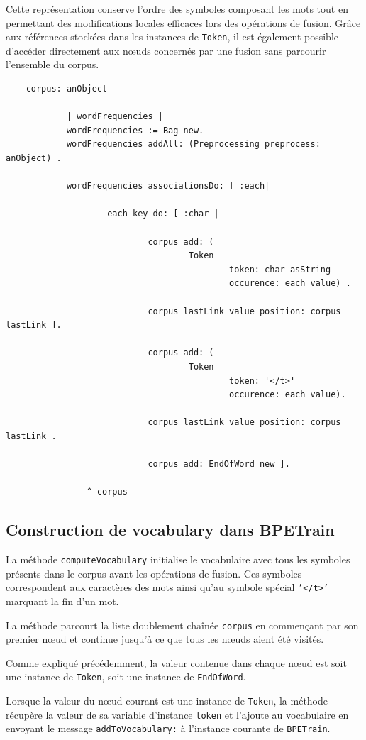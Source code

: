 \documentclass[12pt,a4paper]{report}
\begin{document}
	Cette représentation conserve l'ordre des symboles composant les mots tout en permettant des modifications locales efficaces lors des opérations de fusion. Grâce aux références stockées dans les instances de \texttt{Token}, il est également possible d'accéder directement aux nœuds concernés par une fusion sans parcourir l'ensemble du corpus.
	
	\begin{verbatim}
	corpus: anObject
			
			| wordFrequencies |		
			wordFrequencies := Bag new.	
			wordFrequencies addAll: (Preprocessing preprocess: anObject) .
					
			wordFrequencies associationsDo: [ :each|
							
					each key do: [ :char |
									
							corpus add: (
									Token 
											token: char asString
											occurence: each value) .
											
							corpus lastLink value position: corpus lastLink ].	
								
							corpus add: (
									Token
											token: '</t>'
											occurence: each value).
													
							corpus lastLink value position: corpus lastLink .
									
							corpus add: EndOfWord new ].
								
				^ corpus 
	\end{verbatim}
	
	\subsection{Construction de vocabulary dans BPETrain}
	
	La méthode \texttt{computeVocabulary} initialise le vocabulaire avec tous les symboles présents dans le corpus avant les opérations de fusion. Ces symboles correspondent aux caractères des mots ainsi qu’au symbole spécial \texttt{'</t>'} marquant la fin d’un mot.
	
	La méthode parcourt la liste doublement chaînée \texttt{corpus} en commençant par son premier nœud et continue jusqu'à ce que tous les nœuds aient été visités.
	
	Comme expliqué précédemment, la valeur contenue dans chaque nœud est soit une instance de \texttt{Token}, soit une instance de \texttt{EndOfWord}.
	
	Lorsque la valeur du nœud courant est une instance de \texttt{Token}, la méthode récupère la valeur de sa variable d'instance \texttt{token} et l'ajoute au vocabulaire en envoyant le message \texttt{addToVocabulary:} à l'instance courante de \texttt{BPETrain}.
	
\end{document}
